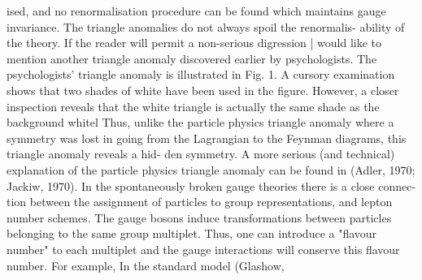 \documentclass[twoside]{article}
\begin{document}
ised, and no renormalisation procedure can be found which maintains gauge
invariance. The triangle anomalies do not always spoil the renormalis-
ability of the theory. If the reader will permit a non-serious digression
| would like to mention another triangle anomaly discovered earlier by
psychologists. The psychologists' triangle anomaly is illustrated in Fig. 1.
A cursory examination shows that two shades of white have been used in the figure.
However, a closer inspection reveals that the white triangle is actually
the same shade as the background whitel Thus, unlike the particle
physics triangle anomaly where a symmetry was lost in going from the
Lagrangian to the Feynman diagrams, this triangle anomaly reveals a hid-
den symmetry. A more serious (and technical) explanation of the particle
physics triangle anomaly can be found in (Adler, 1970; Jackiw, 1970).
In the spontaneously broken gauge theories there is a close connec-
tion between the assignment of particles to group representations, and
lepton number schemes. The gauge bosons induce transformations between
particles belonging to the same group multiplet. Thus, one can introduce
a "flavour number" to each multiplet and the gauge interactions will
conserve this flavour number. For example, In the standard model (Glashow,
\end{document}

